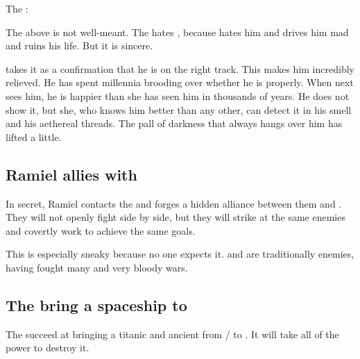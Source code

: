 \begin{prose}
  The \sathariah: 
\end{prose}

The above is not well-meant. 
The \sathariah{} hates \Nexagglachel, because \Nexagglachel{} hates him and drives him mad and ruins his life. 
But it is sincere. 

\Ishnaruchaefir{} takes it as a confirmation that he is on the right track. 
This makes him incredibly relieved. 
He has spent millennia brooding over whether he is  properly. 
When \Criseis{} next sees him, he is happier than she has seen him in thousands of years. 
He does not show it, but she, who knows him better than any other, can detect it in his smell and his aethereal threads. 
The pall of darkness that always hangs over him has lifted a little. 










\subsection{Ramiel allies with \Baelzerach}
In secret, Ramiel contacts the \Baelzerach{} and forges a hidden alliance between them and \Mystraacht. They will not openly fight side by side, but they will strike at the same enemies and covertly work to achieve the same goals. 

This is especially sneaky because no one expects it. \Mystraacht{} and \Baelzerach{} are traditionally enemies, having fought many and very bloody wars. 









\subsection{The \banes bring a spaceship to \Miith}
The \banelords{} succeed at bringing a titanic and ancient  from \Erebos/\Nyx{} to \Miith{}. 
It will take all of the \psp{\dragons}{} \xsic{} power to destroy it.

